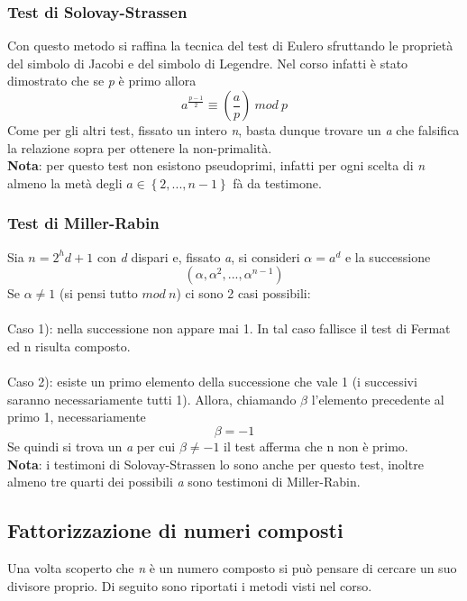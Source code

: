 \documentclass{article}
\begin{document}
	\subsubsection{Test di Solovay-Strassen}
	Con questo metodo si raffina la tecnica del test di Eulero sfruttando le proprietà del simbolo di Jacobi e del simbolo di Legendre. Nel corso infatti è stato dimostrato che se \textit{p} è primo allora \[a^{\frac{p-1}{2}}\equiv \left(\frac{a}{p}\right)\ mod\ p\]
	Come per gli altri test, fissato un intero \textit{n}, basta dunque trovare un \textit{a} che falsifica la relazione sopra per ottenere la non-primalità.\\
	\textbf{Nota}: per questo test non esistono pseudoprimi, infatti per ogni scelta di \textit{n} almeno la metà degli \(a\in\left\{2,...,n-1\right\}\) fà da testimone.
	\vspace{1cm}
	
	\vspace{1cm}
	\subsubsection{Test di Miller-Rabin}
	Sia \(n=2^hd+1\) con \textit{d} dispari e, fissato \textit{a}, si consideri \(\alpha=a^d\) e la successione 
	\[(\alpha,\alpha^2,...,\alpha^{n-1})\]
	Se \(\alpha\not= 1\) (si pensi tutto \(mod\ n\)) ci sono 2 casi possibili:\\ \\ Caso 1): nella successione non appare mai 1. In tal caso fallisce il test di Fermat ed n risulta composto.\\ \\ Caso 2): esiste un primo elemento della successione che vale 1 (i successivi saranno necessariamente tutti 1). Allora, chiamando \(\beta\) l'elemento precedente al primo 1, necessariamente \[\beta=-1\]
	Se quindi si trova un \textit{a} per cui \(\beta\not= -1\) il test afferma che n non è primo.\\\textbf{Nota}: i testimoni di Solovay-Strassen lo sono anche per questo test, inoltre almeno tre quarti dei possibili \textit{a} sono testimoni di Miller-Rabin. 
	\vspace{1cm}
	
	\vspace{1cm}
	\subsection{Fattorizzazione di numeri composti}
	Una volta scoperto che \textit{n} è un numero composto si può pensare di cercare un suo divisore proprio. Di seguito sono riportati i metodi visti nel corso.
\end{document}
